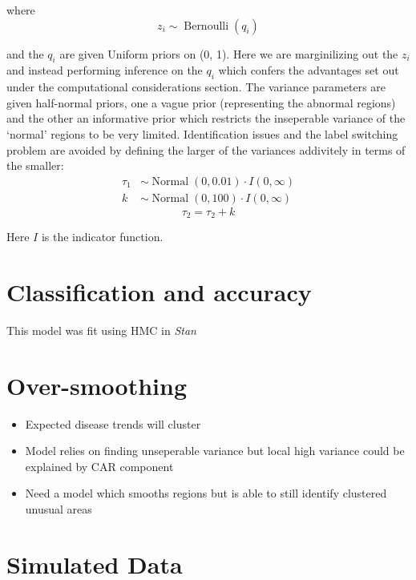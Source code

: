 \documentclass[11pt]{report}
\begin{document}
where
\begin{equation}
  z_i \sim \operatorname{Bernoulli}(q_i)
\end{equation}

and the $q_i$ are given Uniform priors on (0, 1). Here we are marginilizing out the $z_i$ and instead performing inference on the $q_i$ which confers the advantages set out under the computational considerations section. The variance parameters are given half-normal priors, one a vague prior (representing the abnormal regions) and the other an informative prior which restricts the inseperable variance of the `normal' regions to be very limited. Identification issues and the label switching problem are avoided by defining the larger of the variances addivitely in terms of the smaller:
\begin{align}
  \tau_1 &\sim \operatorname{Normal}(0, 0.01) \cdot I(0, \infty) \\
  k &\sim \operatorname{Normal}(0, 100) \cdot I(0, \infty)
\end{align}
\begin{equation}
 \tau_2 = \tau_2 + k
\end{equation}

Here $I$ is the indicator function.

\section{Classification and accuracy}

This model was fit using HMC in \emph{Stan} 

\section{Over-smoothing}

\begin{itemize}
\item Expected disease trends will cluster
\item Model relies on finding unseperable variance but local high variance could be explained by CAR component
\item Need a model which smooths regions but is able to still identify clustered unusual areas
\end{itemize}

\section{Simulated Data}
\end{document}
